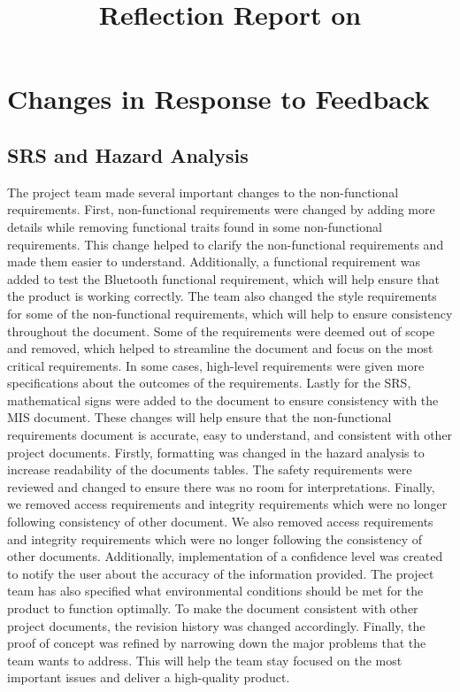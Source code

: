 \documentclass{article}
\title{Reflection Report on \progname}
\author{\authname}
\date{}
\begin{document}
\maketitle

\newpage

\section{Changes in Response to Feedback}

\subsection{SRS and Hazard Analysis}

The project team made several important changes to the non-functional requirements. First, non-functional requirements were changed by adding more details while removing functional traits found in some non-functional requirements. This change helped to clarify the non-functional requirements and made them easier to understand. Additionally, a functional requirement was added to test the Bluetooth functional requirement, which will help ensure that the product is working correctly. The team also changed the style requirements for some of the non-functional requirements, which will help to ensure consistency throughout the document. Some of the requirements were deemed out of scope and removed, which helped to streamline the document and focus on the most critical requirements. In some cases, high-level requirements were given more specifications about the outcomes of the requirements. Lastly for the SRS, mathematical signs were added to the document to ensure consistency with the MIS document. These changes will help ensure that the non-functional requirements document is accurate, easy to understand, and consistent with other project documents. Firstly, formatting was changed in the hazard analysis to increase readability of the documents tables. The safety requirements were reviewed and changed to ensure there was no room for interpretations. Finally, we removed access requirements and integrity requirements which were no longer following consistency of other document. We also removed access requirements and integrity requirements which were no longer following the consistency of other documents. Additionally, implementation of a confidence level was created to notify the user about the accuracy of the information provided. The project team has also specified what environmental conditions should be met for the product to function optimally. To make the document consistent with other project documents, the revision history was changed accordingly. Finally, the proof of concept was refined by narrowing down the major problems that the team wants to address. This will help the team stay focused on the most important issues and deliver a high-quality product.
\end{document}

